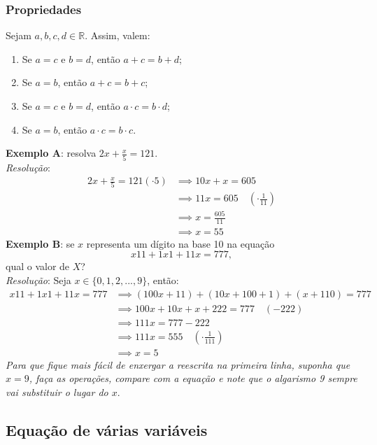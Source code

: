 \documentclass[13pt,letterpaper]{article}
\begin{document}
\subsubsection{Propriedades}
Sejam $a, b, c, d \in \mathbb{R}$. Assim, valem:
\begin{enumerate}
    \item Se $a = c$ e $b = d$, então $a + c = b + d$;
    \item Se $a = b$, então $a + c = b + c$;
    \item Se $a = c$ e $b = d$, então $a \cdot c = b \cdot d$;
    \item Se $a = b$, então $a \cdot c = b \cdot c$.
\end{enumerate}
\textbf{Exemplo A}: resolva $2x + \frac{x}{5} = 121$. \\
\emph{Resolução}:
\begin{align*}
    2x + \frac{x}{5} = 121 (\cdot 5) &\implies 
    10x + x = 605 \\ &\implies
    11x = 605 \quad (\cdot \frac{1}{11}) \\ &\implies 
    x = \frac{605}{11} \\ &\implies 
    x = 55
\end{align*}
\textbf{Exemplo B}: se $x$ representa um dígito na base 10 na equação
\begin{displaymath}
    x11 + 1x1 + 11x = 777,
\end{displaymath}
qual o valor de $X$? \\
\emph{Resolução}: Seja $x \in \{0, 1, 2, ..., 9 \}$, então:
\begin{align*}
    x11 + 1x1 + 11x = 777 &\implies 
    (100x + 11) + (10x + 100 + 1) + (x + 110) = 777 \\ &\implies
    100x + 10x + x + 222 = 777 \quad (-222) \\ &\implies
    111x = 777 - 222 \\ &\implies
    111x = 555 \quad (\cdot \frac{1}{111}) \\ &\implies
    x = 5
\end{align*}
\emph{Para que fique mais fácil de enxergar a reescrita na primeira linha, suponha que $x = 9$, faça as operações, compare com a equação e note que o algarismo 9 sempre vai substituir o lugar do $x$}.

\subsection{Equação de várias variáveis}
\end{document}
